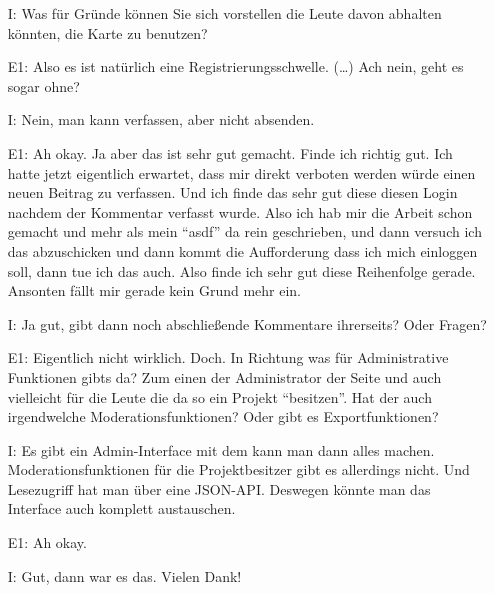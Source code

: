 \begin{itemize}
    \item[I:] Was f{\"u}r Gr{\"u}nde k{\"o}nnen Sie sich vorstellen die Leute davon abhalten k{\"o}nnten, die Karte zu benutzen?
    \item[E1:] Also es ist nat{\"u}rlich eine Registrierungsschwelle. (\dots) Ach nein, geht es sogar ohne?
    \item[I:] Nein, man kann verfassen, aber nicht absenden.
    \item[E1:] Ah okay. Ja aber das ist sehr gut gemacht. Finde ich richtig gut. Ich hatte jetzt eigentlich erwartet, dass mir direkt verboten werden w{\"u}rde einen neuen Beitrag zu verfassen. Und ich finde das sehr gut diese diesen Login nachdem der Kommentar verfasst wurde. Also ich hab mir die Arbeit schon gemacht und mehr als mein "`asdf"' da rein geschrieben, und dann versuch ich das abzuschicken und dann kommt die Aufforderung dass ich mich einloggen soll, dann tue ich das auch. Also finde ich sehr gut diese Reihenfolge gerade. Ansonten f{\"a}llt mir gerade kein Grund mehr ein. 	 
    \item[I:] Ja gut, gibt dann noch abschlie{\ss}ende Kommentare ihrerseits? Oder Fragen?
    \item[E1:] Eigentlich nicht wirklich. Doch. In Richtung was f{\"u}r Administrative Funktionen gibts da? Zum einen der Administrator der Seite und auch vielleicht f{\"u}r die Leute die da so ein Projekt "`besitzen"'. Hat der auch irgendwelche Moderationsfunktionen? Oder gibt es Exportfunktionen?
    \item[I:] Es gibt ein Admin-Interface mit dem kann man dann alles machen. Moderationsfunktionen f{\"u}r die Projektbesitzer gibt es allerdings nicht. Und Lesezugriff hat man {\"u}ber eine JSON-API. Deswegen k{\"o}nnte man das Interface auch komplett austauschen.
    \item[E1:] Ah okay.
    \item[I:] Gut, dann war es das. Vielen Dank!
\end{itemize}
